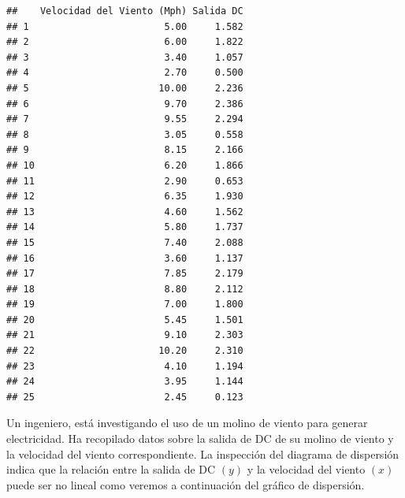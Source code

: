 \documentclass[
]{article}
\newenvironment{Shaded}{\begin{snugshade}}{\end{snugshade}}
\newcommand{\AttributeTok}[1]{\textcolor[rgb]{0.77,0.63,0.00}{#1}}
\newcommand{\DecValTok}[1]{\textcolor[rgb]{0.00,0.00,0.81}{#1}}
\newcommand{\FunctionTok}[1]{\textcolor[rgb]{0.00,0.00,0.00}{#1}}
\newcommand{\NormalTok}[1]{#1}
\newcommand{\SpecialCharTok}[1]{\textcolor[rgb]{0.00,0.00,0.00}{#1}}
\newcommand{\StringTok}[1]{\textcolor[rgb]{0.31,0.60,0.02}{#1}}
\begin{document}
\begin{verbatim}
##    Velocidad del Viento (Mph) Salida DC
## 1                        5.00     1.582
## 2                        6.00     1.822
## 3                        3.40     1.057
## 4                        2.70     0.500
## 5                       10.00     2.236
## 6                        9.70     2.386
## 7                        9.55     2.294
## 8                        3.05     0.558
## 9                        8.15     2.166
## 10                       6.20     1.866
## 11                       2.90     0.653
## 12                       6.35     1.930
## 13                       4.60     1.562
## 14                       5.80     1.737
## 15                       7.40     2.088
## 16                       3.60     1.137
## 17                       7.85     2.179
## 18                       8.80     2.112
## 19                       7.00     1.800
## 20                       5.45     1.501
## 21                       9.10     2.303
## 22                      10.20     2.310
## 23                       4.10     1.194
## 24                       3.95     1.144
## 25                       2.45     0.123
\end{verbatim}

Un ingeniero, está investigando el uso de un molino de viento para
generar electricidad. Ha recopilado datos sobre la salida de DC de su
molino de viento y la velocidad del viento correspondiente. La
inspección del diagrama de dispersión indica que la relación entre la
salida de DC \((y)\) y la velocidad del viento \((x)\) puede ser no
lineal como veremos a continuación del gráfico de dispersión.

\begin{Shaded}
\end{Shaded}
\end{document}
